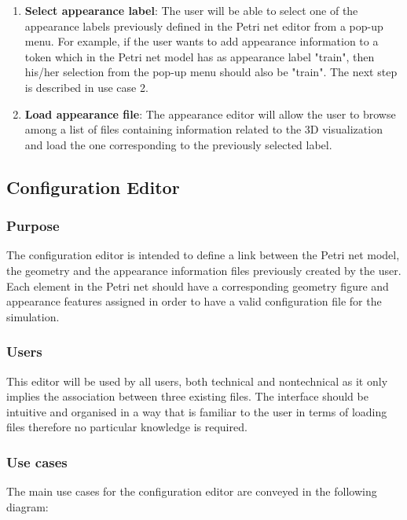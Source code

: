 
\begin{enumerate}
\item \textbf{Select appearance label}: The user will be able to select one of the appearance labels previously defined in the Petri net editor from a pop-up menu. For example, if the user wants to add appearance information to a token which in the Petri net model has as appearance label "train", then his/her selection from the pop-up menu should also be "train". The next step is described in use case 2. 
\item \textbf{Load appearance file}: The appearance editor will allow the user to browse among a list of files containing information related to the 3D visualization and load the one corresponding to the previously selected label.  
\end{enumerate}

   
 
\subsection{Configuration Editor}
\subsubsection{Purpose}
The configuration editor is intended to define a link between the Petri net model, the geometry and the appearance information files previously created by the user. Each element in the Petri net should have a corresponding geometry figure and appearance features assigned in order to have a valid configuration file for the simulation.   
\subsubsection{Users}
This editor will be used by all users, both technical and nontechnical as it only implies the association between three existing files. The interface should be intuitive and organised in a way that is familiar to the user in terms of loading files therefore no particular knowledge is required. 
\subsubsection{Use cases}
The main use cases for the configuration editor are conveyed in the following diagram: 

